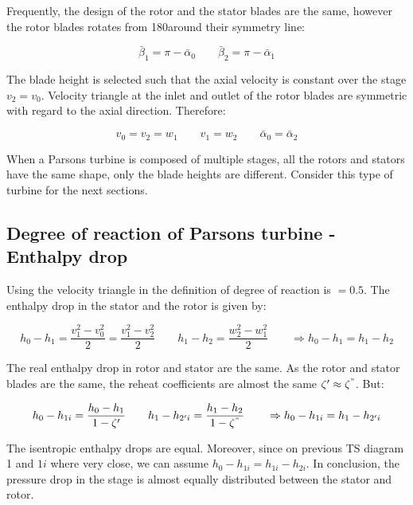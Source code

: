 Frequently, the design of the rotor and the stator blades are the same, however the rotor blades rotates from 180\degres around their symmetry line: 

\begin{equation}
\bar{\beta} _1 = \pi - \bar{\alpha }_0 \qquad \bar{\beta }_2 = \pi - \bar{\alpha }_1 
\end{equation}

The blade height is selected such that the axial velocity is constant over the stage $v_2 = v_0$. Velocity triangle at the inlet and outlet of the rotor blades are symmetric with regard to the axial direction. Therefore: 

\begin{equation}
v_0 = v_2 = w_1 \qquad v_1 = w_2 \qquad \bar{\alpha }_0 = \bar{\alpha }_2 
\end{equation}

When a Parsons turbine is composed of multiple stages, all the rotors and stators have the same shape, only the blade heights are different. Consider this type of turbine for the next sections. 

\subsection{Degree of reaction of Parsons turbine - Enthalpy drop}
Using the velocity triangle in the definition of degree of reaction is $=0.5$. The enthalpy drop in the stator and the rotor is given by: 

\begin{equation}
h_0 - h_1 = \frac{v_1^2 - v_0^2}{2} = \frac{v_1^2 - v_2^2}{2} \qquad h_1-h_2 = \frac{w_2^2-w_1^2}{2}\qquad \Rightarrow h_0 - h_1 = h_1 - h_2
\end{equation}

The real enthalpy drop in rotor and stator are the same. As the rotor and stator blades are the same, the reheat coefficients are almost the same $\zeta ' \approx \zeta ^"$. But: 

\begin{equation}
h_0 - h_{1i} = \frac{h_0 - h_1}{1 - \zeta '} \qquad h_1 - h_{2'i} = \frac{h_1 - h_2}{1 - \zeta ^"} \qquad \Rightarrow h_0 - h_{1i} = h_1 - h_{2'i}
\end{equation}

The isentropic enthalpy drops are equal. Moreover, since on previous TS diagram 1 and $1i$ where very close, we can assume $h_0 - h_{1i} = h_{1i} - h_{2i}$. In conclusion, the pressure drop in the stage is almost equally distributed between the stator and rotor. 

